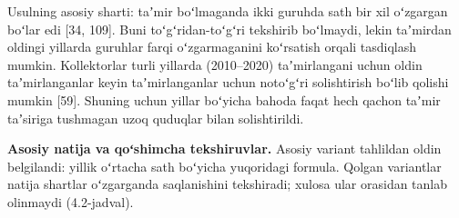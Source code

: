 Usulning asosiy sharti: taʼmir boʻlmaganda ikki guruhda sath bir xil
oʻzgargan boʻlar edi {[}34, 109{]}. Buni toʻgʻridan-toʻgʻri tekshirib
boʻlmaydi, lekin taʼmirdan oldingi yillarda guruhlar farqi
oʻzgarmaganini koʻrsatish orqali tasdiqlash mumkin. Kollektorlar turli
yillarda (2010--2020) taʼmirlangani uchun oldin taʼmirlanganlar keyin
taʼmirlanganlar uchun notoʻgʻri solishtirish boʻlib qolishi mumkin
{[}59{]}. Shuning uchun yillar boʻyicha bahoda faqat hech qachon taʼmir
taʼsiriga tushmagan uzoq quduqlar bilan solishtirildi.

\textbf{Asosiy natija va qoʻshimcha tekshiruvlar.} Asosiy variant
tahlildan oldin belgilandi: yillik oʻrtacha sath boʻyicha yuqoridagi
formula. Qolgan variantlar natija shartlar oʻzgarganda saqlanishini
tekshiradi; xulosa ular orasidan tanlab olinmaydi (4.2-jadval).



